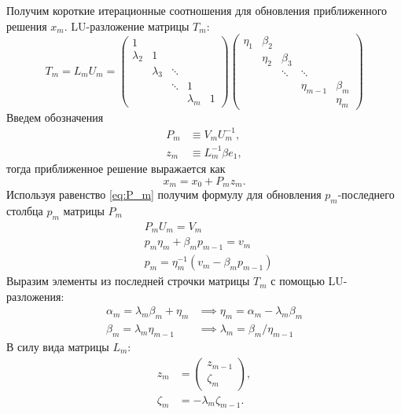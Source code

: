 \par Получим короткие итерационные соотношения для обновления приближенного решения $x_m$.
LU-разложение матрицы $T_m$:
\begin{equation*}
    T_m = L_m U_m = 
        \begin{pmatrix}
        1 & & & & \\
        \lambda_2 & 1 & & & \\
        & \lambda_3 & \ddots & & \\
        & & \ddots & 1 &  \\
        & & & \lambda_m & 1
        \end{pmatrix}
        \begin{pmatrix}
            \eta_1 & \beta_2 & & & \\
             & \eta_2 & \beta_3 & & \\
            & & \ddots & \ddots & \\
            & & & \eta_{m-1} & \beta_m \\
            & & & & \eta_m
        \end{pmatrix}
\end{equation*} 
Введем обозначения
\begin{align}
    P_m &\equiv V_m U_m^{-1}, \label{eq:P_m}\\
    z_m &\equiv L_m^{-1} \beta e_1,
\end{align}
тогда приближенное решение выражается как
\begin{equation}
    x_m = x_0 + P_m z_m.
\end{equation}
Используя равенство \eqref{eq:P_m} получим формулу для обновления $p_m$-последнего
столбца $p_m$ матрицы $P_m$
\begin{align}
    &P_m U_m = V_m \\
    &p_m \eta_m + \beta_m p_{m-1} = v_m \\
    &p_m = \eta_m^{-1} \left( v_m - \beta_m p_{m-1} \right) \label{eq:p_m_update}
\end{align}
Выразим элементы из последней строчки матрицы $T_m$ с помощью LU-разложения:
\begin{align*}
    \alpha_m = \lambda_m \beta_m + \eta_m &\implies \eta_m = \alpha_m - \lambda_m \beta_m \\
    \beta_m = \lambda_m \eta_{m-1} &\implies \lambda_m = \beta_m / \eta_{m-1}
\end{align*}
В силу вида матрицы $L_m$:
\begin{align*}
    z_m &= 
    \begin{pmatrix}
        z_{m-1} \\
        \zeta_m
    \end{pmatrix}, \\
    \zeta_m &= -\lambda_m \zeta_{m-1}. 
\end{align*}
